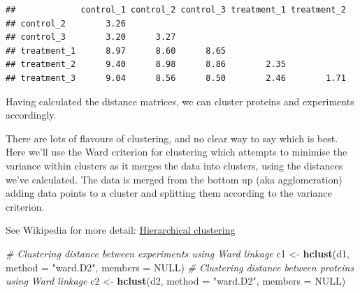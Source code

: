 \documentclass[12pt,]{book}
\newenvironment{Shaded}{\begin{snugshade}}{\end{snugshade}}
\newcommand{\CommentTok}[1]{\textcolor[rgb]{0.56,0.35,0.01}{\textit{#1}}}
\newcommand{\DataTypeTok}[1]{\textcolor[rgb]{0.13,0.29,0.53}{#1}}
\newcommand{\DecValTok}[1]{\textcolor[rgb]{0.00,0.00,0.81}{#1}}
\newcommand{\KeywordTok}[1]{\textcolor[rgb]{0.13,0.29,0.53}{\textbf{#1}}}
\newcommand{\NormalTok}[1]{#1}
\newcommand{\OperatorTok}[1]{\textcolor[rgb]{0.81,0.36,0.00}{\textbf{#1}}}
\newcommand{\OtherTok}[1]{\textcolor[rgb]{0.56,0.35,0.01}{#1}}
\newcommand{\StringTok}[1]{\textcolor[rgb]{0.31,0.60,0.02}{#1}}
\begin{document}
\begin{Shaded}
\end{Shaded}

\begin{verbatim}
##             control_1 control_2 control_3 treatment_1 treatment_2
## control_2        3.26                                            
## control_3        3.20      3.27                                  
## treatment_1      8.97      8.60      8.65                        
## treatment_2      9.40      8.98      8.86        2.35            
## treatment_3      9.04      8.56      8.50        2.46        1.71
\end{verbatim}

Having calculated the distance matrices, we can cluster proteins and experiments
accordingly.

There are lots of flavours of clustering, and no clear way to say which is best.
Here we'll use the Ward criterion for clustering which attempts to minimise the
variance within clusters as it merges the data into clusters, using the distances
we've calculated. The data is merged from the bottom up (aka agglomeration)
adding data points to a cluster and splitting them according to the variance
criterion.

See Wikipedia for more detail:
\href{https://en.wikipedia.org/wiki/Hierarchical_clustering}{Hierarchical clustering}

\begin{Shaded}
\begin{Highlighting}[]
\CommentTok{# Clustering distance between experiments using Ward linkage}
\NormalTok{c1 <-}\StringTok{ }\KeywordTok{hclust}\NormalTok{(d1, }\DataTypeTok{method =} \StringTok{"ward.D2"}\NormalTok{, }\DataTypeTok{members =} \OtherTok{NULL}\NormalTok{)}
\CommentTok{# Clustering distance between proteins using Ward linkage}
\NormalTok{c2 <-}\StringTok{ }\KeywordTok{hclust}\NormalTok{(d2, }\DataTypeTok{method =} \StringTok{"ward.D2"}\NormalTok{, }\DataTypeTok{members =} \OtherTok{NULL}\NormalTok{)}
\end{Highlighting}
\end{Shaded}
\end{document}
